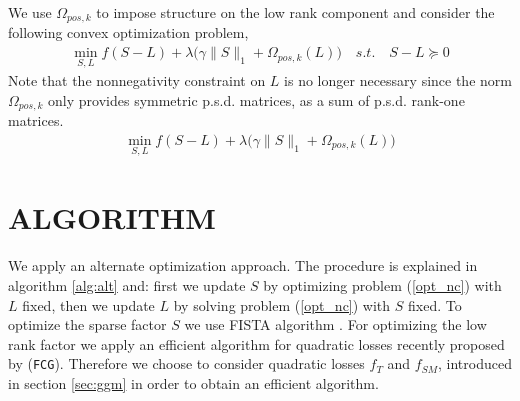 \documentclass[letterpaper]{article}
\begin{document}
We use $\Omega_{pos,k}$ to impose structure on the low rank component and consider the following convex optimization problem,
\begin{align}
\label{opt}
\min_{S,L} f(S-L)+\lambda\big(\gamma\|S\|_{1}+\Omega_{pos,k}(L)\big) \quad s.t. \quad S-L \succeq 0 
\end{align}
Note that the nonnegativity constraint on $L$ is no longer necessary since the norm $\Omega_{pos,k}$ only provides symmetric p.s.d. matrices, as a sum of p.s.d. rank-one matrices.
\begin{align}
\label{opt_nc}
\min_{S,L} f(S-L)+\lambda\big(\gamma\|S\|_{1}+\Omega_{pos,k}(L)\big)
\end{align}
%

\section{ALGORITHM}

We apply an alternate optimization approach. The procedure is explained in algorithm \ref{alg:alt} and: first we update $S$ by optimizing problem (\ref{opt_nc}) with $L$ fixed, then we update $L$ by solving problem (\ref{opt_nc}) with $S$ fixed. To optimize the sparse factor $S$ we use FISTA algorithm \citep{beck2009fast}. For optimizing the low rank factor we apply an efficient algorithm for quadratic losses recently proposed by \citet{vinyes2017}(\texttt{FCG}). Therefore we choose to consider quadratic losses $f_{T}$ and $f_{SM}$, introduced in section \ref{sec:ggm} in order to obtain an efficient algorithm.\\
\end{document}
